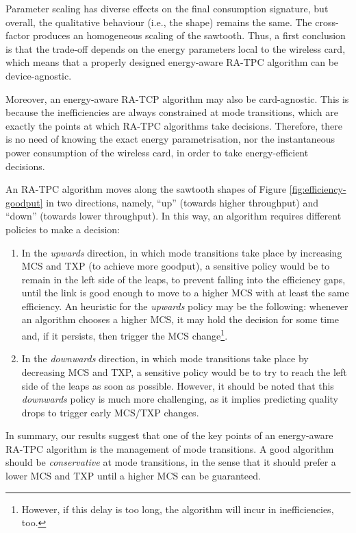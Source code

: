 \documentclass[twoside,nohyper]{tufte-book}
\providecommand{\tightlist}{%
  \setlength{\itemsep}{0pt}\setlength{\parskip}{0pt}}
\theoremstyle{definition}
\theoremstyle{definition}
\theoremstyle{definition}
\theoremstyle{remark}
\begin{document}
Parameter scaling has diverse effects on the final consumption
signature, but overall, the qualitative behaviour (i.e., the shape)
remains the same. The cross-factor produces an homogeneous scaling of
the sawtooth. Thus, a first conclusion is that the trade-off depends on
the energy parameters local to the wireless card, which means that a
properly designed energy-aware RA-TPC algorithm can be device-agnostic.

Moreover, an energy-aware RA-TCP algorithm may also be card-agnostic.
This is because the inefficiencies are always constrained at mode
transitions, which are exactly the points at which RA-TPC algorithms
take decisions. Therefore, there is no need of knowing the exact energy
parametrisation, nor the instantaneous power consumption of the wireless
card, in order to take energy-efficient decisions.

An RA-TPC algorithm moves along the sawtooth shapes of Figure
\ref{fig:efficiency-goodput} in two directions, namely, ``up'' (towards
higher throughput) and ``down'' (towards lower throughput). In this way,
an algorithm requires different policies to make a decision:

\begin{enumerate}
\def\labelenumi{(\roman{enumi})}
\tightlist
\item
  In the \emph{upwards} direction, in which mode transitions take place
  by increasing MCS and TXP (to achieve more goodput), a sensitive
  policy would be to remain in the left side of the leaps, to prevent
  falling into the efficiency gaps, until the link is good enough to
  move to a higher MCS with at least the same efficiency. An heuristic
  for the \emph{upwards} policy may be the following: whenever an
  algorithm chooses a higher MCS, it may hold the decision for some time
  and, if it persists, then trigger the MCS change\footnote{However, if
    this delay is too long, the algorithm will incur in inefficiencies,
    too.}.
\item
  In the \emph{downwards} direction, in which mode transitions take
  place by decreasing MCS and TXP, a sensitive policy would be to try to
  reach the left side of the leaps as soon as possible. However, it
  should be noted that this \emph{downwards} policy is much more
  challenging, as it implies predicting quality drops to trigger early
  MCS/TXP changes.
\end{enumerate}

In summary, our results suggest that one of the key points of an
energy-aware RA-TPC algorithm is the management of mode transitions. A
good algorithm should be \emph{conservative} at mode transitions, in the
sense that it should prefer a lower MCS and TXP until a higher MCS can
be guaranteed.
\end{document}

